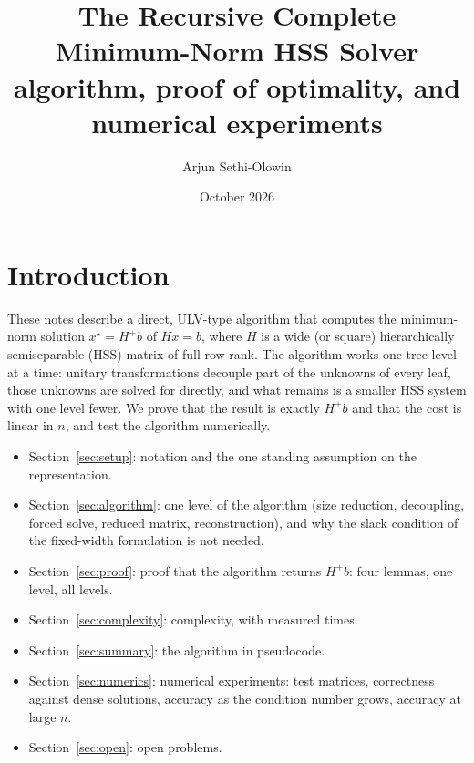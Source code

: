 \documentclass[11pt]{article}
\title{The Recursive Complete Minimum-Norm HSS Solver\\[2pt]
\large algorithm, proof of optimality, and numerical experiments}
\author{Arjun Sethi-Olowin}
\date{October 2026}
\theoremstyle{plain}
\begin{document}
\maketitle

\section{Introduction}
These notes describe a direct, ULV-type algorithm that computes the minimum-norm solution
$x^\star=H^+b$ of $Hx=b$, where $H$ is a wide (or square) hierarchically semiseparable (HSS) matrix of
full row rank. The algorithm works one tree level at a time: unitary transformations decouple part of the
unknowns of every leaf, those unknowns are solved for directly, and what remains is a smaller HSS system
with one level fewer. We prove that the result is exactly $H^+b$ and that the cost is linear in $n$, and
test the algorithm numerically.
\begin{itemize}[leftmargin=1.4em,itemsep=1pt]
\item Section~\ref{sec:setup}: notation and the one standing assumption on the representation.
\item Section~\ref{sec:algorithm}: one level of the algorithm (size reduction, decoupling, forced solve,
reduced matrix, reconstruction), and why the slack condition of the fixed-width formulation is not needed.
\item Section~\ref{sec:proof}: proof that the algorithm returns $H^+b$: four lemmas, one level, all levels.
\item Section~\ref{sec:complexity}: complexity, with measured times.
\item Section~\ref{sec:summary}: the algorithm in pseudocode.
\item Section~\ref{sec:numerics}: numerical experiments: test matrices, correctness against dense
solutions, accuracy as the condition number grows, accuracy at large $n$.
\item Section~\ref{sec:open}: open problems.
\end{itemize}




\end{document}
